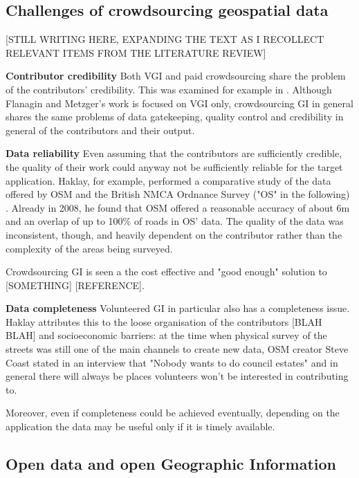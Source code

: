 \subsection{Challenges of crowdsourcing geospatial data}

[STILL WRITING HERE, EXPANDING THE TEXT AS I RECOLLECT RELEVANT ITEMS FROM THE LITERATURE REVIEW]

\textbf{Contributor credibility} Both VGI and paid crowdsourcing share the problem of the contributors' credibility. This was examined for example in \cite{Flanagin:2008ck}. Although Flanagin and Metzger's work is focused on VGI only, crowdsourcing GI in general shares the same problems of data gatekeeping, quality control and credibility in general of the contributors and their output. 

\textbf{Data reliability} Even assuming that the contributors are sufficiently credible, the quality of their work could anyway not be sufficiently reliable for the target application. Haklay, for example, performed a comparative study of the data offered by OSM and the British NMCA Ordnance Survey ("OS" in the following) \cite{Haklay:2010vs}. Already in 2008, he found that OSM offered a reasonable accuracy of about 6m and an overlap of up to 100\% of roads in OS' data. The quality of the data was inconsistent, though, and heavily dependent on the contributor rather than the complexity of the areas being surveyed.

Crowdsourcing GI is seen a the cost effective and "good enough" solution to [SOMETHING] [REFERENCE]. 

\textbf{Data completeness} Volunteered GI in particular also has a completeness issue. Haklay attributes this to the loose organisation of the contributors \cite{Haklay:2010vs} [BLAH BLAH] and socioeconomic barriers: at the time when physical survey of the streets was still one of the main channels to create new data, OSM creator Steve Coast stated in an interview that "Nobody wants to do council estates" \cite{Anonymous:2007ux} and in general there will always be places volunteers won't be interested in contributing to.

Moreover, even if completeness could be achieved eventually, depending on the application the data may be useful only if it is timely available.

\subsection{Open data and open Geographic Information}

